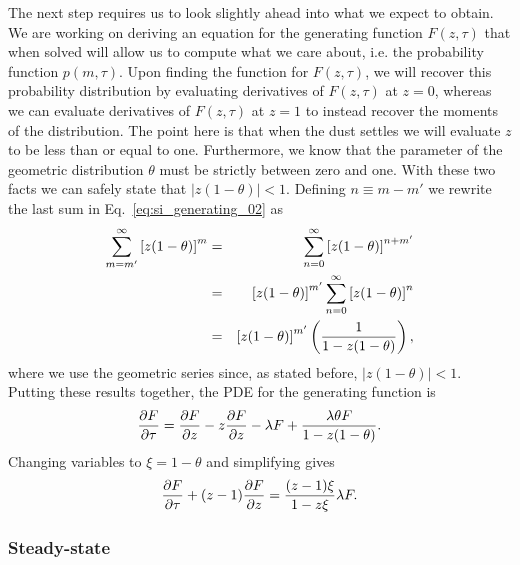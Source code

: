 The next step requires us to look slightly ahead into what we expect to obtain.
We are working on deriving an equation for the generating function $F(z, \tau)$
that when solved will allow us to compute what we care about, i.e. the
probability function $p(m, \tau)$. Upon finding the function for $F(z, \tau)$,
we will recover this probability distribution by evaluating derivatives
of $F(z, \tau)$ at $z=0$, whereas we can evaluate derivatives of
$F(z, \tau)$ at $z=1$ to instead recover the moments of the
distribution. The point here is that when the dust settles we
will evaluate $z$ to be less than or equal to one.
Furthermore, we know that the parameter of the geometric distribution $\theta$
must be strictly between zero and one. With these two facts we can safely state that
$| z (1 - \theta) | < 1$. Defining $n \equiv m - m'$ we rewrite the last sum in
Eq.~\ref{eq:si_generating_02} as
\begin{eqnarray}
\sum_{m=m'}^{\infty} \left[z (1-\theta)\right]^{m} &=&
\sum_{n=0}^{\infty} \left[z (1-\theta)\right]^{n + m'} \\
&=& \left[ z (1 - \theta) \right]^{m'} 
\sum_{n=0}^{\infty} \left[ z (1 - \theta) \right]^{n} \\
&=& \left[ z (1 - \theta) \right]^{m'} 
\left( {1 \over 1 - z (1 - \theta)} \right),
\end{eqnarray}
where we use the geometric series since, as stated before, $| z (1 - \theta) | <
1$. Putting these results together, the PDE for the generating function is
\begin{equation}
{\partial F \over \partial \tau} = 
{\partial F \over\partial z}
- z {\partial F \over \partial z} - \lambda F
+ \frac{\lambda\theta F}{1-z(1-\theta)}.
\end{equation}
Changing variables to $\xi=1-\theta$ and simplifying gives
\begin{align}
{\partial F \over \partial \tau} + (z - 1) {\partial F \over \partial z} = 
\frac{(z-1)\xi}{1-z\xi}\lambda F.
\label{eq:1state_unreg_015}
\end{align}

\subsubsection{Steady-state}

